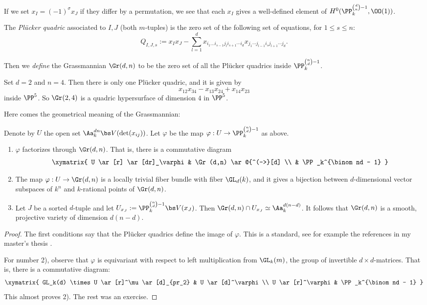 \documentclass[11pt, english]{article}
\begin{document}
If we set $x_I = (-1)^\sigma x_J$ if they differ by a permutation, we see that each $x_I$ gives a well-defined element of $H^0(\PP_k^{\binom dn-1}, \OO(1))$.

The \emph{Plücker quadric} associated to $I,J$ (both $m$-tuples) is the zero set of the following set of equations, for $1 \leq s \leq n$:
\[
Q_{I,J,s} := x_I x_J - \sum_{l=1}^d x_{i_1\dotsc i_{s-1} j_l i_{s+1} \cdots i_d}x_{j_1 \cdots j_{l-1} i_s j_{l+1} \cdots j_d }.
\]

Then we \emph{define} the Grassmannian $\Gr(d,n)$ to be the zero set of all the Plücker quadrics inside $\PP_k^{\binom nd -1}$.

\begin{example}
Set $d=2$ and $n=4$. Then there is only one Plücker quadric, and it is given by
\[
x_{12}x_{34}-x_{13}x_{24}+x_{14}x_{23}
\]
inside $\PP^5$. So $\Gr(2,4)$ is a quadric hypersurface of dimension $4$ in $\PP^5$.
\end{example}

Here comes the geometrical meaning of the Grassmannian:

\begin{prop}
Denote by $U$ the open set $\Aa_k^{dn} \bs V(\det(x_{ij}))$. Let $\varphi$ be the map $\varphi:U \to \PP_k^{\binom nd -1}$ as above.
\begin{enumerate}
\item $\varphi$ factorizes through $\Gr(d,n)$. That is, there is a commutative diagram
\[
\xymatrix{
U \ar[r] \ar[dr]_\varphi & \Gr(d,n) \ar@{^(->}[d] \\
 & \PP_k^{\binom nd - 1}
}
\]
\item The map $\varphi:U \to \Gr(d,n)$ is a locally trivial fiber bundle with fiber $\GL_d(k)$, and it gives a bijection between $d$-dimensional vector subspaces of $k^n$ and $k$-rational points of $\Gr(d,n)$.
\item Let $J$ be a sorted $d$-tuple and let $U_{x_J} := \PP_k^{\binom nd - 1} \bs V(x_J)$. Then $\Gr(d,n) \cap U_{x_J} \simeq \Aa_k^{d(n-d)}$. It follows that $\Gr(d,n)$ is a smooth, projective variety of dimension $d(n-d)$.
\end{enumerate}
\end{prop}
\begin{proof}
The first conditions say that the Plücker quadrics define the image of $\varphi$. This is a standard, see for example the references in my master's thesis \cite{masteroppgaven}.

For number 2), observe that $\varphi$ is equivariant with respect to left multiplication from $\GL_k(m)$, the group of  invertible $d \times d$-matrices. That is, there is a commutative diagram:
\[
\xymatrix{
GL_k(d) \times U \ar[r]^\mu \ar[d]_{pr_2} & U \ar[d]^\varphi \\
U \ar[r]^\varphi & \PP_k^{\binom nd - 1}
}
\]
This almost proves 2). The rest was an exercise.
\end{proof}
 
\end{document}
